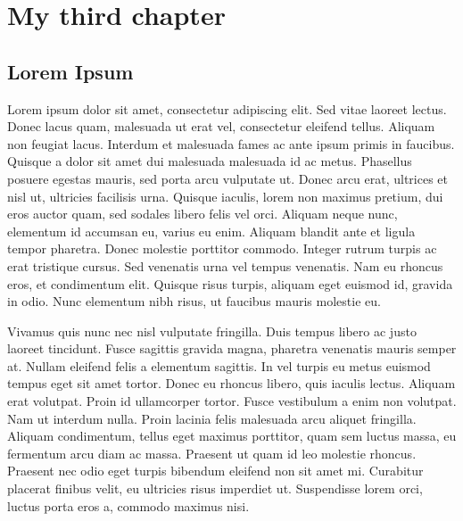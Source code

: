 
\chapter{My third chapter}

\ifpdf
    \graphicspath{{Chapter3/Figs/Raster/}{Chapter3/Figs/PDF/}{Chapter3/Figs/}}
\else
    \graphicspath{{Chapter3/Figs/Vector/}{Chapter3/Figs/}}
\fi

\section{Lorem Ipsum}

Lorem ipsum dolor sit amet, consectetur adipiscing elit. Sed vitae laoreet lectus. Donec lacus quam, malesuada ut erat vel, consectetur eleifend tellus. Aliquam non feugiat lacus. Interdum et malesuada fames ac ante ipsum primis in faucibus. Quisque a dolor sit amet dui malesuada malesuada id ac metus. Phasellus posuere egestas mauris, sed porta arcu vulputate ut. Donec arcu erat, ultrices et nisl ut, ultricies facilisis urna. Quisque iaculis, lorem non maximus pretium, dui eros auctor quam, sed sodales libero felis vel orci. Aliquam neque nunc, elementum id accumsan eu, varius eu enim. Aliquam blandit ante et ligula tempor pharetra. Donec molestie porttitor commodo. Integer rutrum turpis ac erat tristique cursus. Sed venenatis urna vel tempus venenatis. Nam eu rhoncus eros, et condimentum elit. Quisque risus turpis, aliquam eget euismod id, gravida in odio. Nunc elementum nibh risus, ut faucibus mauris molestie eu.

Vivamus quis nunc nec nisl vulputate fringilla. Duis tempus libero ac justo laoreet tincidunt. Fusce sagittis gravida magna, pharetra venenatis mauris semper at. Nullam eleifend felis a elementum sagittis. In vel turpis eu metus euismod tempus eget sit amet tortor. Donec eu rhoncus libero, quis iaculis lectus. Aliquam erat volutpat. Proin id ullamcorper tortor. Fusce vestibulum a enim non volutpat. Nam ut interdum nulla. Proin lacinia felis malesuada arcu aliquet fringilla. Aliquam condimentum, tellus eget maximus porttitor, quam sem luctus massa, eu fermentum arcu diam ac massa. Praesent ut quam id leo molestie rhoncus. Praesent nec odio eget turpis bibendum eleifend non sit amet mi. Curabitur placerat finibus velit, eu ultricies risus imperdiet ut. Suspendisse lorem orci, luctus porta eros a, commodo maximus nisi.

